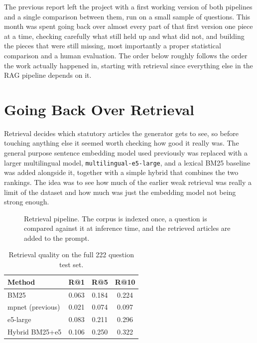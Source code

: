 \documentclass[11pt, a4paper]{article}
\begin{document}
The previous report left the project with a first working version of both pipelines and a single comparison between them, run on a small sample of questions. This month was spent going back over almost every part of that first version one piece at a time, checking carefully what still held up and what did not, and building the pieces that were still missing, most importantly a proper statistical comparison and a human evaluation. The order below roughly follows the order the work actually happened in, starting with retrieval since everything else in the RAG pipeline depends on it.

\section{Going Back Over Retrieval}

Retrieval decides which statutory articles the generator gets to see, so before touching anything else it seemed worth checking how good it really was. The general purpose sentence embedding model used previously was replaced with a larger multilingual model, \texttt{multilingual-e5-large}, and a lexical BM25 baseline was added alongside it, together with a simple hybrid that combines the two rankings. The idea was to see how much of the earlier weak retrieval was really a limit of the dataset and how much was just the embedding model not being strong enough.

\begin{figure}[H]
\centering
{}
\caption{Retrieval pipeline. The corpus is indexed once, a question is compared against it at inference time, and the retrieved articles are added to the prompt.}
\label{fig:ragdiagram}
\end{figure}

\begin{table}[H]
\centering
\small
\begin{tabular}{lccc}
\toprule
\textbf{Method} & \textbf{R@1} & \textbf{R@5} & \textbf{R@10} \\
\midrule
BM25 & 0.063 & 0.184 & 0.224 \\
mpnet (previous) & 0.021 & 0.074 & 0.097 \\
e5-large & 0.083 & 0.211 & 0.296 \\
Hybrid BM25+e5 & 0.106 & 0.250 & 0.322 \\
\bottomrule
\end{tabular}
\caption{Retrieval quality on the full 222 question test set.}
\label{tab:retrieval}
\end{table}
\end{document}
